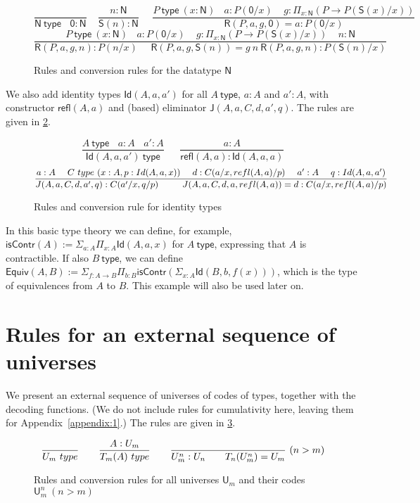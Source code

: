 \documentclass[a4paper,UKenglish,cleveref, autoref, thm-restate]{lipics-v2021}
\newcommand{\Id}{\mathsf{Id}}
\newcommand{\NN}{\mathsf{N}}
\newcommand{\UU}{\mathsf{U}}
\newcommand{\JJ}{\mathsf{J}}
\newcommand{\ZERO}{\mathsf{0}}
\newcommand{\SUCC}{\mathsf{S}}
\newcommand{\type}{\mathsf{type}}
\newcommand{\mypi}[3]{\Pi_{#1:#2}#3}
\newcommand{\mysig}[3]{\Sigma_{#1:#2}#3}
\newcommand{\Sapp}[1]{\sapp{\SUCC}{#1}}
\newcommand{\sapp}[2]{{#1(#2)}} %
\newcommand{\Idapp}[3]{\sapp{\Id}{#1,#2,#3}}
\newcommand{\NRapp}[4]{\sapp{\RR}{#1,#2,#3,#4}}
\newcommand{\Rfapp}[2]{\sapp{\refl}{#1,#2}}
\newcommand{\Japp}[6]{\sapp{\JJ}{#1,#2,#3,#4,#5,#6}}
\newcommand{\RR}{\mathsf{R}}
\newcommand{\T}{\mathsf{T}}
\newcommand{\Equiv}{\mathsf{Equiv}}
\newcommand{\isContr}{\mathsf{isContr}}
\newcommand{\refl}{\mathsf{refl}}
\begin{document}
\begin{figure}[b]
$$
\frac{}{\NN~\type~~~~\ZERO:\NN}~~~~~
\frac{n:\NN}{\Sapp{n} : \NN}~~~~~~
\frac{P~\type~(x:\NN)~~~~a:P(\ZERO/x)~~~~~
g:\mypi{x}{\NN}{(P\to P(\Sapp{x}/x))}}
{\NRapp{P}{a}{g}{\ZERO} = a: P(\ZERO/x) }
$$
$$
\frac{P~\type~(x:\NN)~~~~a:P(\ZERO/x)~~~~~
g:\mypi{x}{\NN}{(P\to P(\Sapp{x}/x))}~~~~~n:\NN}
{\NRapp{P}{a}{g}{n}:P(n/x)~~~~~~\NRapp{P}{a}{g}{\Sapp{n}} = g~n~\NRapp{P}{a}{g}{n}: P(\Sapp{n}/x) }
$$
  \caption{Rules and conversion rules for the datatype $\NN$}\label{fig:typeN}
\end{figure}

We also add identity types $\Idapp{A}{a}{a'}$ for all $A~\type$,
$a:A$ and $a':A$, with constructor $\Rfapp{A}{a}$ and (based) eliminator
$\Japp{A}{a}{C}{d}{a'}{q}$. The rules are given in \cref{fig:typeId}.

\begin{figure}[t]
$$
\frac{A~\type ~~~~ a:A ~~~~ a':A}{\Idapp{A}{a}{a'}~\type}~~~~~~~
\frac{a:A}{\Rfapp{A}{a}:\Idapp{A}{a}{a}}
$$
$$
\frac{a:A~~~~C~\type~(x:A,p:\Idapp{A}{a}{x})~~~~d:C(a/x,\Rfapp{A}{a}/p)
~~~~a':A~~~~q:\Idapp{A}{a}{a'}}
{\Japp{A}{a}{C}{d}{a'}{q}: C(a'/x,q/p) ~~~~~~~~
 \Japp{A}{a}{C}{d}{a}{\Rfapp{A}{a}} = d : C(a/x,\Rfapp{A}{a}/p)}
\belowdisplayshortskip 0pt
$$
  \caption{Rules and conversion rule for identity types}\label{fig:typeId}
\end{figure}

In this basic type theory we can define, for example,
$\isContr(A) := \mysig{a}{A}{\mypi{x}{A}{\Id(A,a,x)}}$
for $A~\type$, expressing that $A$ is contractible.
If also $B~\type$, we can define $\Equiv(A,B) :=
\mysig{f}{A\to B}{\mypi{b}{B}{\isContr(\mysig{x}{A}{\Id(B,b,f(x))})}}$,
which is the type of equivalences from $A$ to $B$. This example
will also be used later on.

\section{Rules for an external sequence of universes}\label{sec:external}

We present an external sequence of universes of codes of types, together
with the decoding functions. (We do not include rules for cumulativity here, leaving them for Appendix~\ref{appendix:1}.)
The rules are given in \cref{fig:typeU}.

\begin{figure}[h!]
$$
\frac{}{\UU_m~\type}~~~~~~
\frac{A:\UU_{m}}{\T_{m}(A)~\type}~~~~~~
\frac{}{\UU^{n}_{m}:\UU_{n}~~~~~~\T_{n}({\UU^{n}_{m}}) = \UU_{m}}{~(n>m)}
\belowdisplayshortskip 0pt
$$
  \caption{Rules and conversion rules for all universes $\UU_m$ and their codes $\UU^{n}_{m}~(n>m)$}\label{fig:typeU}
\end{figure}
\end{document}
